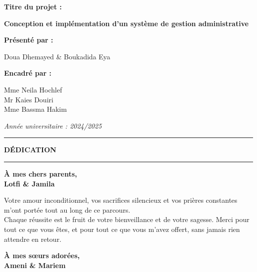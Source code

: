 \documentclass[a4paper,11pt]{report}
\begin{document}
\begin{titlepage}
  {\large\bfseries Titre du projet :}\par\vspace{1ex}
  \begin{tcolorbox}[
    colback=blue!10!white, colframe=blue!50!black,
    boxrule=1pt, arc=4pt,
    auto outer arc, halign=center,
    top=8pt, bottom=8pt, left=6pt, right=6pt,
    width=0.85\textwidth
  ]
    {\Large\bfseries Conception et implémentation d'un système de gestion administrative}
  \end{tcolorbox}\par\vspace{5ex}

  {\large\bfseries Présenté par :}\par\vspace{1ex}
  {\normalsize Doua Dhemayed \& Boukadida Eya}\par\vspace{5ex}

  {\large\bfseries Encadré par :}\par\vspace{1ex}
  {\normalsize
    Mme Neila Hochlef \\ Mr Kaies Douiri \\ Mme Bassma Hakim
  }\par\vspace{5ex}

  {\small\itshape Année universitaire : 2024/2025}

\end{titlepage}



\thispagestyle{empty}
\begin{center}
    \rule{\linewidth}{0.5pt}
    \vspace{0.5cm}

    {\LARGE \textbf{DÉDICATION}}

    \vspace{0.5cm}
    \rule{\linewidth}{0.5pt}
\end{center}
\begin{center}
    \textbf{\Large À mes chers parents,}\\[0.2cm]
    \textbf{\LARGE Lotfi \& Jamila}
\end{center}

\noindent
Votre amour inconditionnel, vos sacrifices silencieux et vos prières constantes m’ont portée tout au long de ce parcours.\\
Chaque réussite est le fruit de votre bienveillance et de votre sagesse. Merci pour tout ce que vous êtes, et pour tout ce que vous m’avez offert, sans jamais rien attendre en retour.
\vspace{0.3cm}
\begin{center}
    \textbf{\Large À mes sœurs adorées,}\\[0.2cm]
    \textbf{\LARGE Ameni \& Mariem}
\end{center}
\end{document}

